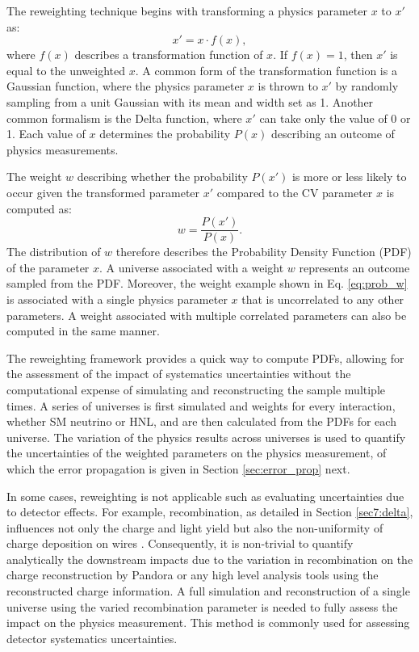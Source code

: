 The reweighting technique begins with transforming a physics parameter $x$ to $x'$ as: 
\begin{equation}
	x' = x \cdot f(x),
\end{equation}
where $f(x)$ describes a transformation function of $x$. 
If $f(x) = 1$, then $x'$ is equal to the unweighted $x$.
A common form of the transformation function  is a Gaussian function, where the physics parameter $x$ is thrown to $x'$ by randomly sampling from a unit Gaussian with its mean and width set as 1.
Another common formalism is the Delta function, where $x'$ can take only the value of 0 or 1. 
Each value of $x$ determines the probability $P(x)$ describing an outcome of physics measurements.

The weight $w$ describing whether the probability $P(x')$ is more or less likely to occur given the transformed parameter $x'$ compared to the CV parameter $x$ is computed as:
\begin{equation}
\label{eq:prob_w}
	w = \frac{P(x')}{P(x)}.
\end{equation}
The distribution of $w$ therefore describes the Probability Density Function (PDF) of the parameter $x$.
A universe associated with a weight $w$ represents an outcome sampled from the PDF.
Moreover, the weight example shown in Eq. \ref{eq:prob_w} is associated with a single physics parameter $x$ that is uncorrelated to any other parameters.
A weight associated with multiple correlated parameters can also be computed in the same manner.

The reweighting framework provides a quick way to compute PDFs, allowing for the assessment of the impact of systematics uncertainties without the computational expense of simulating and reconstructing the sample multiple times.
A series of universes is first simulated and weights for every interaction, whether SM neutrino or HNL, and are then calculated from the PDFs for each universe.
The variation of the physics results across universes is used to quantify the uncertainties of the weighted parameters on the physics measurement, of which the error propagation is given in Section \ref{sec:error_prop} next.

In some cases, reweighting is not applicable such as evaluating uncertainties due to detector effects.
For example, recombination, as detailed in Section \ref{sec7:delta}, influences not only the charge and light yield but also the non-uniformity of charge deposition on wires \cite{elipsoid_recomb}. 
Consequently, it is non-trivial to quantify analytically the downstream impacts due to the variation in recombination on the charge reconstruction by Pandora or any high level analysis tools using the reconstructed charge information.
A full simulation and reconstruction of a single universe using the varied recombination parameter is needed to fully assess the impact on the physics measurement. 
This method is commonly used for assessing detector systematics uncertainties.

